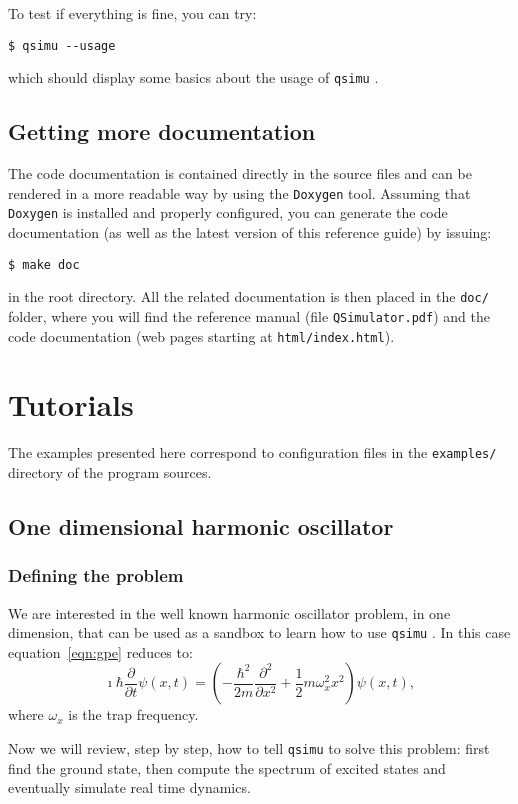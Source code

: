 \documentclass[12pt,a4paper]{report}
\newcommand{\qsimu}{\texttt{qsimu}{} }
\begin{document}
To test if everything is fine, you can try:
\begin{verbatim}
$ qsimu --usage
\end{verbatim}
which should display some basics about the usage of \qsimu.

\subsection{\label{sec:doc}Getting more documentation}
The code documentation is contained directly in the source files and can be rendered in a more readable way by using the \texttt{Doxygen} tool.
Assuming that \texttt{Doxygen} is installed and properly configured, you can generate the code documentation (as well as the latest version of this reference guide) by issuing:
\begin{verbatim}
$ make doc
\end{verbatim}
in the root directory.
All the related documentation is then placed in the \texttt{doc/} folder, where you will find the reference manual (file \texttt{QSimulator.pdf}) and the code documentation (web pages starting at \texttt{html/index.html}).

\section{Tutorials}
The examples presented here correspond to configuration files in the \texttt{examples/} directory of the program sources.

\subsection{One dimensional harmonic oscillator}
\subsubsection{Defining the problem}
We are interested in the well known harmonic oscillator problem, in one dimension, that can be used as a sandbox to learn how to use \qsimu. 
In this case equation~\eqref{eqn:gpe} reduces to:
\begin{equation}
\imath\hbar\frac{\partial}{\partial t}\psi(x,t)=\left(-\frac{\hbar^2}{2m}\frac{\partial^2}{\partial x^2}+\frac{1}{2}m\omega_x^2 x^2\right)\psi(x,t),
\label{eqn:1dho}
\end{equation}
where $\omega_x$ is the trap frequency.

Now we will review, step by step, how to tell \qsimu to solve this problem: first find the ground state, then compute the spectrum of excited states and eventually simulate real time dynamics.
\end{document}
